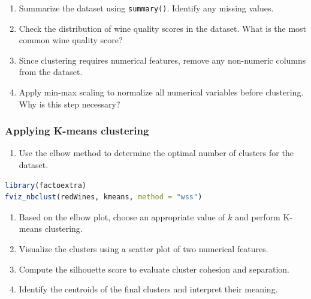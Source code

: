 \documentclass[
]{book}
\newcommand{\passthrough}[1]{#1}
\providecommand{\tightlist}{%
  \setlength{\itemsep}{0pt}\setlength{\parskip}{0pt}}
\theoremstyle{definition}
\theoremstyle{definition}
\theoremstyle{definition}
\theoremstyle{definition}
\theoremstyle{remark}
\begin{document}
\begin{enumerate}
\def\labelenumi{\arabic{enumi}.}
\setcounter{enumi}{21}
\tightlist
\item
  Summarize the dataset using \passthrough{\lstinline!summary()!}. Identify any missing values.\\
\item
  Check the distribution of wine quality scores in the dataset. What is the most common wine quality score?\\
\item
  Since clustering requires numerical features, remove any non-numeric columns from the dataset.\\
\item
  Apply min-max scaling to normalize all numerical variables before clustering. Why is this step necessary?
\end{enumerate}

\subsubsection*{Applying K-means clustering}\label{applying-k-means-clustering-1}

\begin{enumerate}
\def\labelenumi{\arabic{enumi}.}
\setcounter{enumi}{25}
\tightlist
\item
  Use the elbow method to determine the optimal number of clusters for the dataset.\\
\end{enumerate}

\begin{lstlisting}[language=R]
library(factoextra)
fviz_nbclust(redWines, kmeans, method = "wss")
\end{lstlisting}

\begin{enumerate}
\def\labelenumi{\arabic{enumi}.}
\setcounter{enumi}{26}
\tightlist
\item
  Based on the elbow plot, choose an appropriate value of \(k\) and perform K-means clustering.\\
\item
  Visualize the clusters using a scatter plot of two numerical features.\\
\item
  Compute the silhouette score to evaluate cluster cohesion and separation.\\
\item
  Identify the centroids of the final clusters and interpret their meaning.
\end{enumerate}
\end{document}
